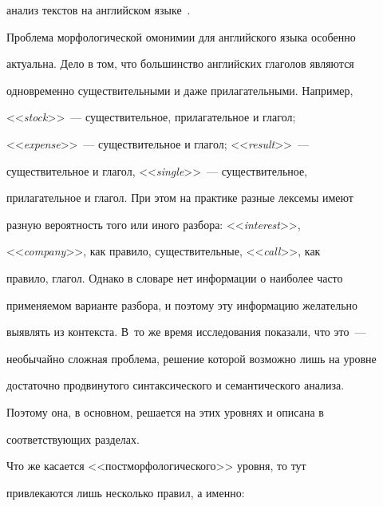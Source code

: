 анализ  текстов на английском языке~\cite{10-2-9}.


   


   Проблема морфологической омонимии для английского языка особенно 


актуальна. Дело в том, что большинство английских глаголов являются 


одновременно существительными и даже прилагательными. Например, 


<<\textit{stock}>>~--- существительное, прилагательное и глагол; 


<<\textit{expense}>>~--- существительное и глагол; <<\textit{result}>>~--- 


существительное и глагол, <<\textit{single}>>~--- существительное, 


прилагательное и глагол. При этом на практике разные лексемы  имеют 


разную вероятность того или иного разбора: <<\textit{interest}>>, 


<<\textit{company}>>, как правило, существительные, <<\textit{call}>>,  как 


правило, глагол. Однако в словаре нет информации о наиболее часто 


применяемом варианте разбора, и поэтому эту информацию желательно 


выявлять из контекста. В~то же время исследования показали, что это~--- 


необычайно сложная проблема, решение которой возможно лишь на уровне 


достаточно продвинутого синтаксического и семантического анализа. 


Поэтому она, в основном, решается на этих уровнях и описана в 


соответствующих разделах.


   


   Что же касается <<постморфологического>> уровня, то тут 


привлекаются лишь несколько правил, а именно:



